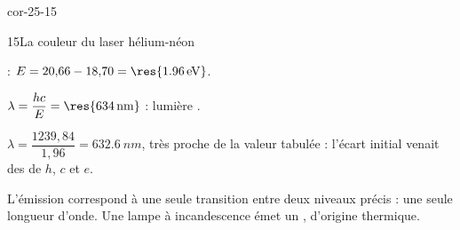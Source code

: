 \begin{blocLivre}{cor-25-15}
\begin{corrige}{15}{La couleur du laser hélium-néon}
\begin{questions}
\item {} : $E=20{,}66-18{,}70=\res{\qty{1,96}{eV}}$.
\item $\lambda=\dfrac{hc}{E}=\res{\qty{634}{nm}}$ : lumière .
\item $\lambda=\dfrac{1239{,}84}{1{,}96}=\qty{632,6}{nm}$, très proche de la valeur tabulée : l'écart initial venait des
 de $h$, $c$ et $e$.
\item L'émission correspond à une seule transition entre deux niveaux précis : une seule longueur d'onde. Une lampe à
incandescence émet un , d'origine thermique.
\end{questions}
\end{corrige}
\end{blocLivre}
